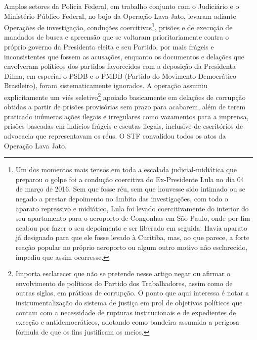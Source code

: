 Amplos setores da Polícia Federal, em trabalho conjunto com o Judiciário
e o Ministério Público Federal, no bojo da Operação Lava-Jato, levaram
adiante Operações de investigação, conduções coercitivas\footnote{Um dos
  momentos mais tensos em toda a escalada judicial-midiática que
  preparou o golpe foi a condução coercitiva do Ex-Presidente Lula no
  dia 04 de março de 2016. Sem que fosse réu, sem que houvesse sido
  intimado ou se negado a prestar depoimento no âmbito das
  investigações, com todo o aparato repressivo e midiático, Lula foi
  levado coercitivamente do interior do seu apartamento para o aeroporto
  de Congonhas em São Paulo, onde por fim acabou por fazer o seu
  depoimento e ser liberado em seguida. Havia aparato já designado para
  que ele fosse levado à Curitiba, mas, ao que parece, a forte reação
  popular no próprio aeroporto ou algum outro motivo não esclarecido,
  impediu que assim ocorresse.}, prisões e de execução de mandados de
busca e apreensão que se voltaram prioritariamente contra o próprio
governo da Presidenta eleita e seu Partido, por mais frágeis e
inconsistentes que fossem as acusações, enquanto os documentos e
delações que envolveram políticos dos partidos favorecidos com a
deposição da Presidenta Dilma, em especial o PSDB e o PMDB (Partido do
Movimento Democrático Brasileiro), foram sistematicamente ignorados. A
operação assumiu explicitamente um viés seletivo\footnote{Importa
  esclarecer que não se pretende nesse artigo negar ou afirmar o
  envolvimento de políticos do Partido dos Trabalhadores, assim como de
  outras siglas, em práticas de corrupção. O ponto que aqui interessa é
  notar a instrumentalização do sistema de justiça em prol de objetivos
  políticos que contam com a necessidade de rupturas institucionais e de
  expedientes de exceção e antidemocráticos, adotando como bandeira
  assumida a perigosa fórmula de que os fins justificam os meios.}
apoiado basicamente em delações de corrupção obtidas a partir de prisões
provisórias sem prazo para acabarem, além de terem praticado inúmeras
ações ilegais e irregulares como vazamentos para a imprensa, prisões
baseadas em indícios frágeis e escutas ilegais, inclusive de escritórios
de advocacia que representavam os réus. O STF convalidou todos os atos
da Operação Lava Jato.

